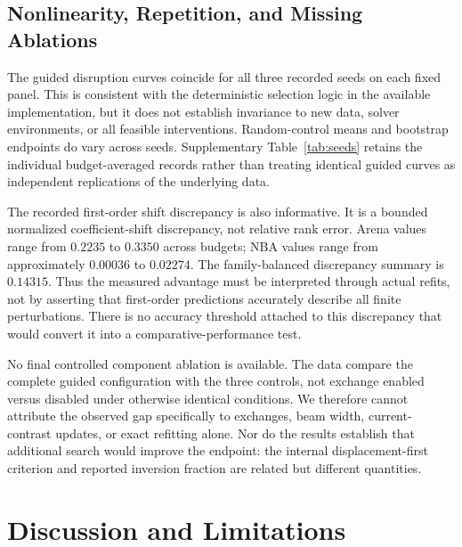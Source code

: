 \documentclass{article}
\begin{document}
\subsection{Nonlinearity, Repetition, and Missing Ablations}
The guided disruption curves coincide for all three recorded seeds on each fixed panel. This is consistent with the deterministic selection logic in the available implementation, but it does not establish invariance to new data, solver environments, or all feasible interventions. Random-control means and bootstrap endpoints do vary across seeds. Supplementary Table~\ref{tab:seeds} retains the individual budget-averaged records rather than treating identical guided curves as independent replications of the underlying data.

The recorded first-order shift discrepancy is also informative. It is a bounded normalized coefficient-shift discrepancy, not relative rank error. Arena values range from $0.2235$ to $0.3350$ across budgets; NBA values range from approximately $0.00036$ to $0.02274$. The family-balanced discrepancy summary is $0.14315$. Thus the measured advantage must be interpreted through actual refits, not by asserting that first-order predictions accurately describe all finite perturbations. There is no accuracy threshold attached to this discrepancy that would convert it into a comparative-performance test.

No final controlled component ablation is available. The data compare the complete guided configuration with the three controls, not exchange enabled versus disabled under otherwise identical conditions. We therefore cannot attribute the observed gap specifically to exchanges, beam width, current-contrast updates, or exact refitting alone. Nor do the results establish that additional search would improve the endpoint: the internal displacement-first criterion and reported inversion fraction are related but different quantities.

\section{Discussion and Limitations}
\end{document}
